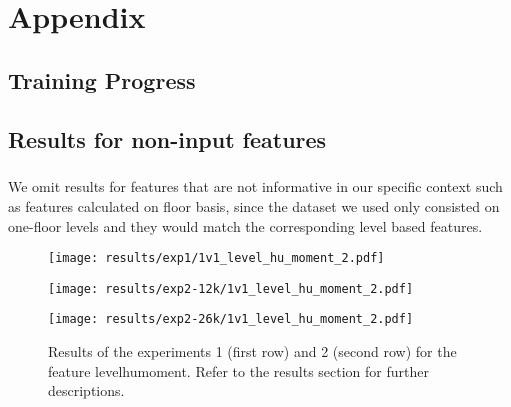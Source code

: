 \chapter{Appendix}
\section{Training Progress}


\section{Results for non-input features}
\paragraph{} We omit results for features that are not informative in our specific context such as features calculated on floor basis, since the dataset we used only consisted on one-floor levels and they would match the corresponding level based features.



\begin{figure}[h!]
	\centering
	\begin{minipage}{0.4\linewidth}
		\texttt{[image: results/exp1/1v1\_level\_hu\_moment\_2.pdf]}
	\end{minipage}
	
	\begin{minipage}{0.4\linewidth}
		\texttt{[image: results/exp2-12k/1v1\_level\_hu\_moment\_2.pdf]}
	\end{minipage}
	\begin{minipage}{0.4\linewidth}
		\texttt{[image: results/exp2-26k/1v1\_level\_hu\_moment\_2.pdf]}
	\end{minipage}
	
	\caption[ Results: Feature level\textunderscore hu\textunderscore moment]{ Results of the experiments 1 (first row) and 2 (second row) for the feature level\textunderscore hu\textunderscore moment. Refer to the results section for further descriptions. }
	\label{fig:appendix_level_hu_moment_2}
\end{figure}

